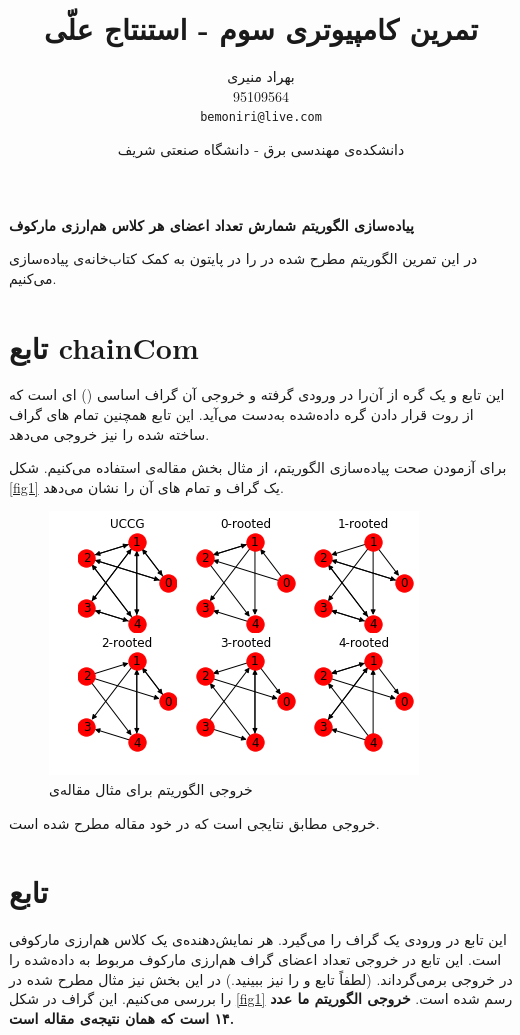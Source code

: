 \documentclass{article}
\title{تمرین کامپیوتری سوم - استنتاج علّی}
\author{بهراد منیری\\95109564\\ \texttt{bemoniri@live.com}}
\date{دانشکده‌ی مهندسی برق - دانشگاه صنعتی شریف}
\begin{document}
\maketitle
\begin{center}
\begin{Large}\textbf{ 
 پیاده‌سازی الگوریتم شمارش تعداد اعضای هر کلاس هم‌ارزی مارکوف
}
\end{Large}
\end{center}


در این تمرین الگوریتم مطرح شده در 
\cite{count}
را در پایتون به کمک کتاب‌خانه‌‌ی
پیاده‌سازی می‌کنیم. 
\section{
تابع
	chainCom}
این تابع
و یک گره از آن‌را در ورودی گرفته و خروجی آن گراف اساسی () ای است که از روت قرار دادن گره داده‌شده به‌دست می‌آید. این تابع همچنین تمام
های گراف ساخته شده را نیز خروجی می‌دهد.

برای آزمودن صحت پیاده‌سازی الگوریتم، از مثال بخش 
 مقاله‌ی 
\cite{count}
استفاده می‌کنیم. شکل 
\eqref{fig1}
 یک گراف 
 و تمام 
 ‌های آن را نشان می‌دهد.
\begin{figure}[h!]
\includegraphics[scale=0.7]{papergraph.png}
\caption{خروجی الگوریتم‌ برای مثال مقاله‌ی
\cite{count}	
}
\label{fig1}
\end{figure}
خروجی مطابق نتایجی است که در خود مقاله مطرح شده است.

\section{تابع 
}
این تابع در ورودی یک گراف 
را می‌گیرد. هر 
نمایش‌دهنده‌ی یک کلاس هم‌ارزی مارکوفی است. این تابع در خروجی تعداد اعضای گراف هم‌ارزی مارکوف مربوط به 
داده‌شده را در خروجی برمی‌گرداند. (لطفاً تابع
و 
را نیز ببینید.)
در این‌ بخش نیز مثال مطرح شده در 
\cite{count}
را بررسی می‌کنیم. این گراف در شکل 
\eqref{fig1}
رسم شده است.
\textbf{ خروجی الگوریتم‌ ما عدد ۱۴ است که همان نتیجه‌ی مقاله است.}
\end{document}
